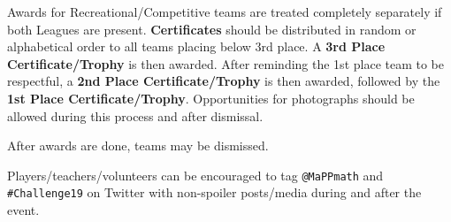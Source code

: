 Awards for Recreational/Competitive teams are treated completely separately
if both Leagues are present.
\textbf{Certificates} should be distributed in 
random or alphabetical order to all teams placing
below 3rd place. A \textbf{3rd Place Certificate/Trophy} is then awarded.
After reminding the 1st place team to be respectful, a
\textbf{2nd Place Certificate/Trophy} is then awarded, followed by the
\textbf{1st Place Certificate/Trophy}. Opportunities for photographs should
be allowed during this process and after dismissal.

After awards are done, teams may be dismissed.


Players/teachers/volunteers can be encouraged to tag \texttt{@MaPPmath}
and \texttt{\#Challenge19} on Twitter with non-spoiler posts/media during
and after the event.

\normalsize

